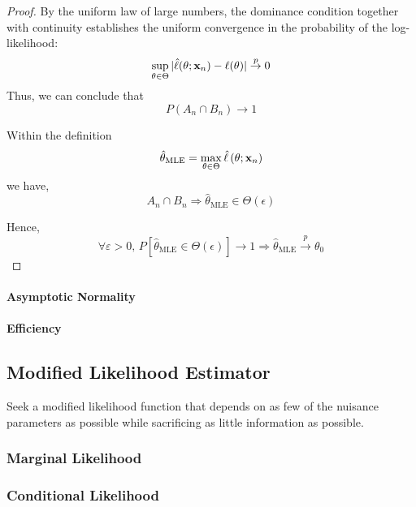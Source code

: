 \begin{proof}
	By the uniform law of large numbers, the dominance condition together with continuity establishes the uniform convergence in the probability of the log-likelihood:
	\begin{equation}
		\sup_{\theta\in\Theta}|\hat{\ell}(\theta;{\bf x}_{n})-\ell(\theta)|\stackrel{p}{\rightarrow}0
	\end{equation}
	Thus, we can conclude that
	\begin{equation}
		P\left(A_{n}\cap B_{n}\right)\rightarrow 1
	\end{equation}

	Within the definition
	\begin{equation}
		\hat{\theta}_{\text{MLE}}=\max_{\theta\in\Theta}\hat{\ell}\left(\theta;{\bf x}_{n}\right)
	\end{equation}
	we have,
	\begin{equation*}
		A_{n}\cap B_{n}\Longrightarrow\hat{\theta}_{\text{MLE}}\in\Theta(\epsilon)
	\end{equation*}

	Hence,
	\begin{equation*}
		\forall\varepsilon>0,\,P\left[\hat{\theta}_{\text{MLE}}\in\Theta(\epsilon)\right]\rightarrow 1\Longrightarrow\hat{\theta}_{\text{MLE}}\stackrel{p}{\rightarrow}\theta_{0}
	\end{equation*}
\end{proof}

\paragraph{Asymptotic Normality}

\paragraph{Efficiency}

\subsection{Modified Likelihood Estimator}

Seek a modified likelihood function that depends on as few of the nuisance parameters as possible while sacrificing as little information as possible.

\subsubsection{Marginal Likelihood}

\subsubsection{Conditional Likelihood}

